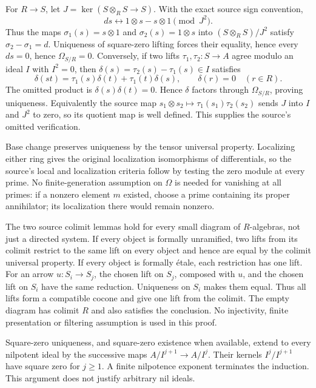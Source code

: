For \(R\to S\), let \(J=\ker(S\otimes_R S\to S)\). With the exact source sign convention, \[
ds\longleftrightarrow 1\otimes s-s\otimes1\pmod {J^2}.
\] Thus the maps \(\sigma_1(s)=s\otimes1\) and \(\sigma_2(s)=1\otimes s\) into \((S\otimes_R S)/J^2\) satisfy \(\sigma_2-\sigma_1=d\). Uniqueness of square-zero lifting forces their equality, hence every \(ds=0\), hence \(\Omega_{S/R}=0\). Conversely, if two lifts \(\tau_1,\tau_2:S\to A\) agree modulo an ideal \(I\) with \(I^2=0\), then \(\delta(s)=\tau_2(s)-\tau_1(s)\in I\) satisfies \[
\delta(st)=\tau_1(s)\delta(t)+\tau_1(t)\delta(s),
\qquad \delta(r)=0\quad(r\in R).
\] The omitted product is \(\delta(s)\delta(t)=0\). Hence \(\delta\) factors through \(\Omega_{S/R}\), proving uniqueness. Equivalently the source map \(s_1\otimes s_2\mapsto\tau_1(s_1)\tau_2(s_2)\) sends \(J\) into \(I\) and \(J^2\) to zero, so its quotient map is well defined. This supplies the source's omitted verification.

Base change preserves uniqueness by the tensor universal property. Localizing either ring gives the original localization isomorphisms of differentials, so the source's local and localization criteria follow by testing the zero module at every prime. No finite-generation assumption on \(\Omega\) is needed for vanishing at all primes: if a nonzero element \(m\) existed, choose a prime containing its proper annihilator; its localization there would remain nonzero.

The two source colimit lemmas hold for every small diagram of \(R\)-algebras, not just a directed system. If every object is formally unramified, two lifts from its colimit restrict to the same lift on every object and hence are equal by the colimit universal property. If every object is formally étale, each restriction has one lift. For an arrow \(u:S_i\to S_j\), the chosen lift on \(S_j\), composed with \(u\), and the chosen lift on \(S_i\) have the same reduction. Uniqueness on \(S_i\) makes them equal. Thus all lifts form a compatible cocone and give one lift from the colimit. The empty diagram has colimit \(R\) and also satisfies the conclusion. No injectivity, finite presentation or filtering assumption is used in this proof.

Square-zero uniqueness, and square-zero existence when available, extend to every nilpotent ideal by the successive maps \(A/I^{j+1}\to A/I^j\). Their kernels \(I^j/I^{j+1}\) have square zero for \(j\geq1\). A finite nilpotence exponent terminates the induction. This argument does not justify arbitrary nil ideals.

